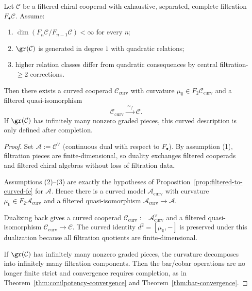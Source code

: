 \begin{theorem}
\label{thm:filtered-to-curved}
Let $\mathcal{C}$ be a filtered chiral cooperad with exhaustive, separated, complete
filtration $F_\bullet\mathcal{C}$. Assume:
\begin{enumerate}
\item $\dim(F_n\mathcal{C}/F_{n-1}\mathcal{C})<\infty$ for every $n$;
\item $\gr(\mathcal{C})$ is generated in degree $1$ with quadratic relations;
\item higher relation classes differ from quadratic consequences by central
filtration-$\ge2$ corrections.
\end{enumerate}
Then there exists a curved cooperad $\mathcal{C}_{\mathrm{curv}}$ with curvature
$\mu_0\in F_2\mathcal{C}_{\mathrm{curv}}$ and a filtered quasi-isomorphism
\[
\mathcal{C}_{\mathrm{curv}}\xrightarrow{\;\simeq_f\;}\mathcal{C}.
\]
If $\gr(\mathcal{C})$ has infinitely many nonzero graded pieces, this curved
description is only defined after completion.
\end{theorem}

\begin{proof}
Set $\mathcal{A}:=\mathcal{C}^\vee$ (continuous dual with respect to
$F_\bullet$). By assumption (1), filtration pieces are finite-dimensional, so
duality exchanges filtered cooperads and filtered chiral algebras without loss
of filtration data.

Assumptions (2)--(3) are exactly the hypotheses of
Proposition~\ref{prop:filtered-to-curved-fc} for $\mathcal{A}$. Hence there is a
curved model $\mathcal{A}_{\mathrm{curv}}$ with curvature
$\mu_0\in F_2\mathcal{A}_{\mathrm{curv}}$ and a filtered quasi-isomorphism
$\mathcal{A}_{\mathrm{curv}}\to\mathcal{A}$.

Dualizing back gives a curved cooperad
$\mathcal{C}_{\mathrm{curv}}:=\mathcal{A}_{\mathrm{curv}}^\vee$ and a filtered
quasi-isomorphism $\mathcal{C}_{\mathrm{curv}}\to\mathcal{C}$. The curved identity
$d^2=[\mu_0,-]$ is preserved under this dualization because all filtration
quotients are finite-dimensional.

If $\gr(\mathcal{C})$ has infinitely many nonzero graded pieces, the curvature
decomposes into infinitely many filtration components. Then the bar/cobar
operations are no longer finite strict and convergence requires completion,
as in Theorem~\ref{thm:conilpotency-convergence} and
Theorem~\ref{thm:bar-convergence}.
\end{proof}

